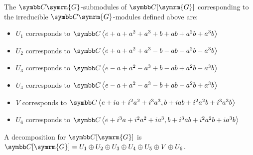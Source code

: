 \begin{solution}
The \(\complex \symrm{G}\)-submodules of \(\complex[\symrm{G}]\) corresponding to the irreducible \(\complex \symrm{G}\)-modules defined above are:
\begin{itemize}
    \item \(U_1\) corresponds to \(\complex\generatedby{e + a + a^2 + a^3 + b + a b + a^2 b + a^3 b}\)
    
    \item \(U_2\) corresponds to \(\complex\generatedby{e + a + a^2 + a^3 - b  - a b - a^2 b - a^3 b}\)
    
    \item \(U_3\) corresponds to \(\complex\generatedby{e - a + a^2 - a^3 + b - ab + a^2 b - a^3 b}\)
    
    \item \(U_4\) corresponds to \(\complex\generatedby{e - a + a^2 - a^3 - b + ab - a^2 b + a^3 b}\)
    
    \item \(V\) corresponds to \(\complex\generatedby{e + i a + i^2 a^2 + i^3 a^3, b + i a b + i^2 a^2 b + i^3 a^3 b}\)
    
    \item \(U_6\) corresponds to \(\complex\generatedby{e + i^3 a + i^2 a^2 + i a^3, b + i^3 ab + i^2 a^2 b + i a^3 b}\)
\end{itemize}
A decomposition for \(\complex[\symrm{G}]\) is \(\complex[\symrm{G}] = U_1 \oplus U_2 \oplus U_3 \oplus U_4 \oplus U_5 \oplus V \oplus U_6\).
\end{solution}

